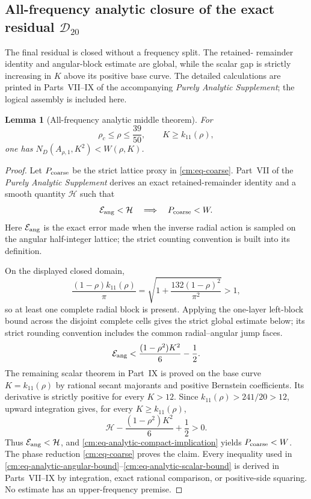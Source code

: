 \documentclass[11pt]{article}
\numberwithin{equation}{section}
\newtheorem{lemma}[theorem]{Lemma}
\theoremstyle{definition}
\theoremstyle{remark}
\begin{document}
\subsection{All-frequency analytic closure of the exact residual
\texorpdfstring{\(\mathcal D_{20}\)}{D20}}

The final residual is closed without a frequency split.  The retained-
remainder identity and angular-block estimate are global, while the scalar
gap is strictly increasing in \(K\) above its positive base curve.  The
detailed calculations are printed in Parts~VII--IX of the accompanying
\emph{Purely Analytic Supplement}; the logical assembly is included here.

\begin{lemma}[All-frequency analytic middle theorem]
\label{cm:lem-compact-certificate}
For
\[
 \rho_c\leq\rho\leq\frac{39}{50},
 \qquad
 K\geq k_{11}(\rho),
\]
one has \(N_D(A_{\rho,1},K^2)<W(\rho,K)\).
\end{lemma}

\begin{proof}
Let \(P_{\rm coarse}\) be the strict lattice proxy in
\eqref{cm:eq-coarse}.  Part~VII of the \emph{Purely Analytic Supplement}
derives an exact retained-remainder identity and a smooth quantity
\(\mathcal H\) such that
\begin{equation}
 \mathcal E_{\rm ang}<\mathcal H
 \quad\Longrightarrow\quad
 P_{\rm coarse}<W.
 \label{cm:eq-analytic-compact-implication}
\end{equation}
Here \(\mathcal E_{\rm ang}\) is the exact error made when the inverse
radial action is sampled on the angular half-integer lattice; the strict
counting convention is built into its definition.

On the displayed closed domain,
\[
 \frac{(1-\rho)k_{11}(\rho)}{\pi}
 =\sqrt{1+\frac{132(1-\rho)^2}{\pi^2}}>1,
\]
so at least one complete radial block is present.  Applying the one-layer
left-block bound across the disjoint complete cells gives the strict global
estimate below; its strict rounding convention includes the common
radial--angular jump faces.
\begin{equation}
 \mathcal E_{\rm ang}
 <\frac{(1-\rho^2)K^2}{6}-\frac12.
 \label{cm:eq-analytic-angular-bound}
\end{equation}
The remaining scalar theorem in Part~IX is proved on the base curve
\(K=k_{11}(\rho)\) by rational secant majorants and positive Bernstein
coefficients.  Its derivative is strictly positive for every \(K>12\).
Since \(k_{11}(\rho)>241/20>12\), upward integration gives, for every
\(K\geq k_{11}(\rho)\),
\begin{equation}
 \mathcal H-\frac{(1-\rho^2)K^2}{6}+\frac12>0.
 \label{cm:eq-analytic-scalar-bound}
\end{equation}
Thus \(\mathcal E_{\rm ang}<\mathcal H\), and
\eqref{cm:eq-analytic-compact-implication} yields
\(P_{\rm coarse}<W\).  The phase reduction
\eqref{cm:eq-coarse} proves the claim.  Every inequality used in
\eqref{cm:eq-analytic-angular-bound}--\eqref{cm:eq-analytic-scalar-bound}
is derived in Parts~VII--IX by integration, exact rational comparison,
or positive-side squaring.  No estimate has an upper-frequency premise.
\end{proof}
\end{document}
